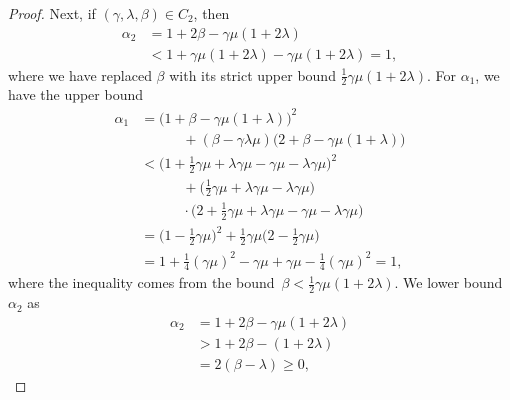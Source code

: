 \documentclass[9pt,shortpaper,twoside,web]{ieeecolor}
\newcommand{\X}{\ensuremath{\mathcal{X}}\xspace}
\newcommand{\V}{\ensuremath{\mathcal{V}}\xspace}
\begin{document}
\begin{proof}
    Next, if $(\gamma,\lambda,\beta)\in C_2$, then
    \begin{align}
        \alpha_2 &= 1+2\beta-\gamma\mu(1+2\lambda)
        \\ &< 1 +\gamma\mu(1+2\lambda) - \gamma\mu(1+2\lambda)=1,
    \end{align}
    where we have replaced $\beta$ with its strict upper bound $\frac{1}{2}\gamma\mu(1+2\lambda)$.
    For $\alpha_1$, we have the upper bound
    \begin{align}
        \alpha_1 &= \big(1+\beta-\gamma\mu(1+\lambda)\big)^2 
        \\ &\quad\quad\quad +  (\beta-\gamma\lambda\mu)\big(2+\beta-\gamma\mu(1+\lambda)\big)
        \\ &< \big(1 +\frac{1}{2}\gamma\mu+\lambda \gamma\mu -\gamma\mu-\lambda\gamma\mu\big)^2
        \\ &\quad\quad\quad + \big( \frac{1}{2}\gamma\mu+\lambda\gamma\mu-\lambda\gamma\mu\big)
        \\ & \quad\quad\quad \cdot\big(2 + \frac{1}{2}\gamma\mu+\lambda \gamma\mu - \gamma\mu-\lambda\gamma\mu\big)
        \\ &= \big( 1- \frac{1}{2}\gamma\mu\big)^2+ \frac{1}{2}\gamma\mu\big(2-\frac{1}{2}\gamma\mu\big)
        \\ &= 1 + \frac{1}{4}(\gamma\mu)^2 -\gamma\mu+\gamma\mu - \frac{1}{4}(\gamma\mu)^2=1,
    \end{align}
    where the inequality comes from the bound~$\beta<\frac{1}{2}\gamma\mu(1+2\lambda)$.
    We lower bound $\alpha_2$ as    
    \begin{align}
        \alpha_2 &= 1 + 2\beta-\gamma\mu(1+2\lambda)
            \\ &> 1+ 2\beta-(1+2\lambda)
            \\ &= 2(\beta-\lambda)\geq0,
    \end{align}

\end{proof}
\end{document}
